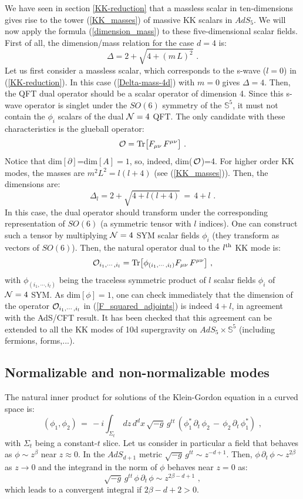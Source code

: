 \documentclass[12pt,notitlepage,a4paper]{article}
\newcommand{\beq}{\begin{equation}}
\newcommand{\eeq}{\end{equation}}
\begin{document}
We have seen in section \ref{KK-reduction} that a massless scalar in ten-dimensions gives rise to the tower (\ref{KK_masses}) of massive KK scalars in $AdS_5$. We will now apply the formula (\ref{dimension_mass}) to these five-dimensional scalar fields. First of all, the dimension/mass relation for the case  $d=4$  is:
\beq
\Delta=2+\sqrt{4+(m\,L)^2}\,\,.
\label{Delta-mass-4d}
\eeq
Let us first consider a massless scalar, which corresponds to the s-wave ($l=0$) in (\ref{KK-reduction}). In this case (\ref{Delta-mass-4d}) with $m=0$ gives $\Delta=4$. Then, the QFT dual operator should be  a scalar operator of dimension 4. Since this s-wave operator is singlet under the $SO(6)$ symmetry of the ${\mathbb S}^5$, it must not contain the $\phi_i$  scalars of the dual ${\cal N}=4$ QFT. The only candidate with these characteristics is the glueball operator:
\beq
{\cal O}={\rm Tr}\big[ F_{\mu\nu}\,F^{\mu\nu}\big]\,\,.
\eeq
Notice that  dim$[\partial]$=dim$[A]=1$, so, indeed, dim($\,{\cal O}$)=4. For higher order KK  modes, the masses are $m^2 L^2=l(l+4)$ (see (\ref{KK_masses})). Then, the dimensions are:
\beq
\Delta_l=2+\sqrt{4+l(l+4)}\,=\,4+l\,\,. 
\eeq
In this case, the dual operator should transform under the corresponding representation of $SO(6)$ (a symmetric tensor with $l$ indices). One can construct such a tensor by multiplying ${\cal N}=4$ SYM scalar fields $\phi_i$ (they transform as vectors of $SO(6)$). Then, the natural operator dual to the $l^{{\rm th}}$ KK mode is:
\beq
{\cal O}_{i_1,\cdots, i_l}={\rm Tr}\big[\phi_{(i_1,\cdots, i_l)}
 F_{\mu\nu}\,F^{\mu\nu}\big]\,\,,
 \label{F_squared_adjoints}
 \eeq
with $\phi_{(i_1,\cdots, i_l)}$ being the traceless symmetric product of $l$ scalar fields $\phi_i$  of  ${\cal N}=4$ SYM.  As dim$[\phi]=1$, one can check immediately that the dimension of the operator 
${\cal O}_{i_1,\cdots, i_l}$ in  (\ref{F_squared_adjoints})  is indeed $4+l$, in agreement with the AdS/CFT result. It has been checked that this agreement can be extended to all the KK modes of 10d supergravity on  $AdS_5\times {\mathbb S}^5$ (including fermions, forms,...). 


\subsection{Normalizable and non-normalizable modes}


The natural inner product for solutions of the Klein-Gordon equation in a curved space is:
\beq
(\phi_1,\phi_2)\,=\,-i\int_{\Sigma_t}\,
dz\,d^dx\,\sqrt{-g}\,g^{tt}\,
(\phi_1^*\,\partial_t\,\phi_2\,-\,\phi_2\,\partial_t\,\phi_1^*)\,\,,
\eeq
with $\Sigma_t$ being a constant-$t$ slice.  Let us consider in particular a field that behaves as $\phi\sim z^{\beta}$ near $z\approx 0$. In the $AdS_{d+1}$ metric $\sqrt{-g}\,g^{tt}\sim z^{-d+1}$. Then, $\phi\,\partial_t\,\phi\sim z^{2\beta}$ as $z\to 0$ and the integrand in the norm of $\phi$ behaves near $z=0$ as:
\beq
\sqrt{-g}\,g^{tt}\,
\phi\,\partial_t\,\phi\sim z^{2\beta-d+1}\,\,,
\eeq
which leads to a  convergent  integral if $2\beta-d+2>0$.
\end{document}
